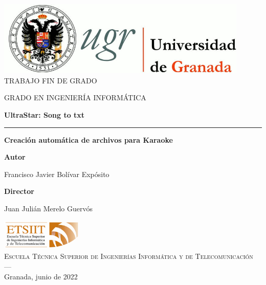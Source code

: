 \begin{titlepage}
\newlength{\centeroffset}
\setlength{\centeroffset}{-0.5\oddsidemargin}
\addtolength{\centeroffset}{0.5\evensidemargin}
\thispagestyle{empty}

\noindent\hspace*{\centeroffset}\begin{minipage}{\textwidth}

\centering
\includegraphics[width=0.9\textwidth]{logos/logo_ugr.jpg}\\[1.4cm]

\textsc{ \Large TRABAJO FIN DE GRADO}
\vspace{0.2cm}

\textsc{ GRADO EN INGENIERÍA INFORMÁTICA}
\vspace{1cm}

{\Huge\bfseries UltraStar: Song to txt \\}
\noindent\rule[-1ex]{\textwidth}{3pt}

\vspace{3.5ex}
{\large\bfseries Creación automática de archivos para Karaoke}
\end{minipage}

\vspace{2.5cm}
\noindent\hspace*{\centeroffset}
\begin{minipage}{\textwidth}
\centering

\textbf{Autor} 

{Francisco Javier Bolívar Expósito}
\vspace{2.5ex}

\textbf{Director} 

{Juan Julián Merelo Guervós}
\vspace{2cm}

\includegraphics[width=0.3\textwidth]{logos/etsiit_logo.png}\\[0.1cm]
\textsc{Escuela Técnica Superior de Ingenierías Informática y de Telecomunicación}\\
\textsc{---}\\
Granada, junio de 2022
\end{minipage}
\end{titlepage}
